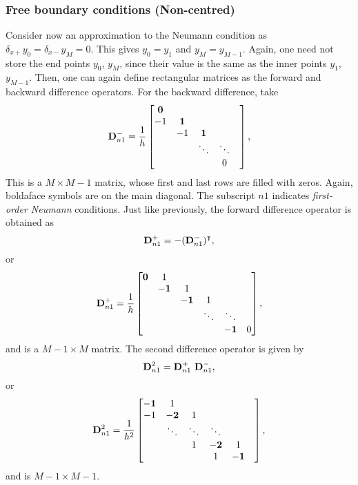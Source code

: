 \documentclass[11pt,twoside,a4paper,english]{book}
\begin{document}
\subsubsection{Free boundary conditions (Non-centred)}
Consider now an approximation to the Neumann condition as $\delta_{x+}y_0 = \delta_{x-}y_M=0$. This gives $y_0=y_1$ and $y_M=y_{M-1}$. Again, one need not store the end points $y_0$, $y_M$, since their value is the same as the inner points $y_1$, $y_{M-1}$. Then, one can again define rectangular matrices as the forward and backward difference operators. For the backward difference, take
\begin{equation}
{\bf D}^-_{n1}  = \frac{1}{h}\begin{bmatrix}
{\bf 0} &  &   &   \\ 
-1& {\bf 1} & & &    \\
&-1 & {\bf 1} & &    \\
& & \ddots & \ddots &    \\
& &  & 0&   
\end{bmatrix},
\end{equation}
This is a $M \times M-1$ matrix, whose first and last rows are filled with zeros. Again, boldaface symbols are on the main diagonal. The subscript ${n1}$ indicates \emph{first-order Neumann} conditions. Just like previously, the forward difference operator is obtained as
\begin{equation}
{\bf D}^+_{n1} = -({\bf D}^-_{n1})^\intercal,
\end{equation}
or
\begin{equation}
{\bf D}^+_{n1} = \frac{1}{h}\begin{bmatrix}
{\bf 0} &  1 &   &   &\\ 
& {\bf -1} & 1 & &  &  \\
& & {\bf -1} & 1&   & \\
& & & \ddots &  \ddots & \\
& & &  & {\bf -1}&   0
\end{bmatrix},
\end{equation}
and is a $M-1\times M$ matrix. The second difference operator is given by
\begin{equation}\label{eq:SecondDiffMatNeumann}
{\bf D}^2_{n1} = {\bf D}^+_{n1} \,\, {\bf D}^-_{n1},
\end{equation}
or
\begin{equation}\label{eq:D2Neum1}
{\bf D}^2_{n1} = \frac{1}{h^2}\begin{bmatrix}
{\bf -1}& 1&   &  &  &  \\ 
-1& {\bf -2} & 1 &  &  &\\
& \ddots & \ddots & \ddots &  &      \\
& &  1 & {\bf -2}& 1   \\
& &   & 1 & {\bf -1}   \\
\end{bmatrix},
\end{equation}
and is $M-1 \times M-1$.
\end{document}

